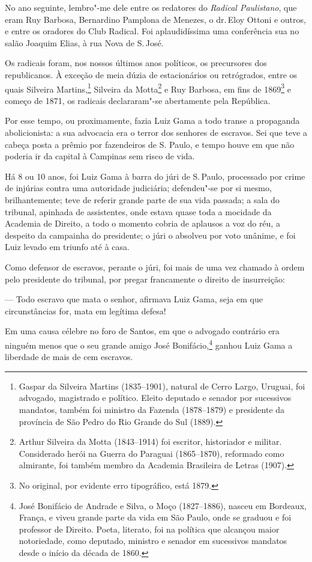 No ano seguinte, lembro"-me dele entre os redatores do \emph{Radical
Paulistano}, que eram Ruy Barbosa, Bernardino Pamplona de Menezes, o dr.\,Eloy Ottoni e outros, e entre os oradores do Club Radical. Foi
aplaudidíssima uma conferência sua no salão Joaquim Elias, à rua Nova de
S.\,José.

Os radicais foram, nos nossos últimos anos políticos, os precursores dos
republicanos. À exceção de meia dúzia de estacionários ou retrógrados,
entre os quais Silveira Martins,\footnote{Gaspar da Silveira Martins
  (1835--1901), natural de Cerro Largo, Uruguai, foi advogado, magistrado
  e político. Eleito deputado e senador por sucessivos mandatos, também
  foi ministro da Fazenda (1878--1879) e presidente da província de São
  Pedro do Rio Grande do Sul (1889).} Silveira da Motta\footnote{
  Arthur Silveira da Motta (1843--1914) foi escritor, historiador e
  militar. Considerado herói na Guerra do Paraguai (1865--1870),
  reformado como almirante, foi também membro da Academia Brasileira de
  Letras (1907).} e Ruy Barbosa, em fins de 1869\footnote{No original,
  por evidente erro tipográfico, está 1879.} e começo de 1871, os
radicais declararam"-se abertamente pela República.

Por esse tempo, ou proximamente, fazia Luiz Gama a todo transe a
propaganda abolicionista: a sua advocacia era o terror dos senhores de
escravos. Sei que teve a cabeça posta a prêmio por fazendeiros de S.
Paulo, e tempo houve em que não poderia ir da capital à Campinas sem
risco de vida.

Há 8 ou 10 anos, foi Luiz Gama à barra do júri de S.\,Paulo, processado
por crime de injúrias contra uma autoridade judiciária; defendeu"-se por
si mesmo, brilhantemente; teve de referir grande parte de sua vida
passada; a sala do tribunal, apinhada de assistentes, onde estava quase
toda a mocidade da Academia de Direito, a todo o momento cobria de
aplausos a voz do réu, a despeito da campainha do presidente; o júri o
absolveu por voto unânime, e foi Luiz levado em triunfo até à casa.

Como defensor de escravos, perante o júri, foi mais de uma vez chamado à
ordem pelo presidente do tribunal, por pregar francamente o direito de
insurreição:

--- Todo escravo que mata o senhor, afirmava Luiz Gama, seja em que
circunstâncias for, mata em legítima defesa!

Em uma causa célebre no foro de Santos, em que o advogado contrário era
ninguém menos que o seu grande amigo José Bonifácio,\footnote{José \label{bonifacio}
  Bonifácio de Andrade e Silva, o Moço (1827--1886), nasceu em Bordeaux,
  França, e viveu grande parte da vida em São Paulo, onde se graduou e
  foi professor de Direito. Poeta, literato, foi na política que
  alcançou maior notoriedade, como deputado, ministro e senador em
  sucessivos mandatos desde o início da década de 1860.} ganhou Luiz
Gama a liberdade de mais de cem escravos.

